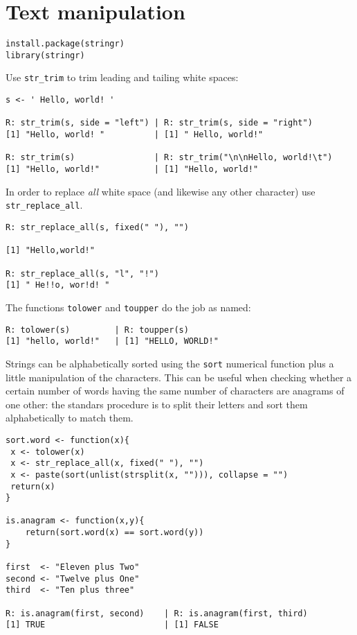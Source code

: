\chapter{Text manipulation}\label{sec: text}
\texttt{install.package(stringr)}\\
\texttt{library(stringr)}
\bigskip 

Use \texttt{str\_trim} to trim leading and 
tailing white spaces:
\begin{verbatim}
s <- ' Hello, world! '

R: str_trim(s, side = "left") | R: str_trim(s, side = "right")
[1] "Hello, world! "          | [1] " Hello, world!"

R: str_trim(s)                | R: str_trim("\n\nHello, world!\t")
[1] "Hello, world!"           | [1] "Hello, world!"
\end{verbatim}
In order to replace \emph{all} white space (and likewise
any other character) use \texttt{str\_replace\_all}.
\begin{verbatim}
R: str_replace_all(s, fixed(" "), "") 

[1] "Hello,world!"

R: str_replace_all(s, "l", "!")
[1] " He!!o, wor!d! "
\end{verbatim}
The functions \texttt{tolower} and \texttt{toupper}
do the job as named:
\begin{verbatim}
R: tolower(s)         | R: toupper(s)
[1] "hello, world!"   | [1] "HELLO, WORLD!"
\end{verbatim}
Strings can be alphabetically sorted using the 
\texttt{sort} numerical function plus a little manipulation
of the characters. This can be useful when checking
whether a certain number of words having the same number
of characters are anagrams of one other: the standars
procedure is to split their letters and sort them
alphabetically to match them. 
\begin{verbatim}
sort.word <- function(x){
 x <- tolower(x)
 x <- str_replace_all(x, fixed(" "), "")    
 x <- paste(sort(unlist(strsplit(x, ""))), collapse = "") 
 return(x)
}

is.anagram <- function(x,y){
    return(sort.word(x) == sort.word(y))
}

first  <- "Eleven plus Two"
second <- "Twelve plus One"
third  <- "Ten plus three"

R: is.anagram(first, second)    | R: is.anagram(first, third)
[1] TRUE                        | [1] FALSE                        
\end{verbatim}

